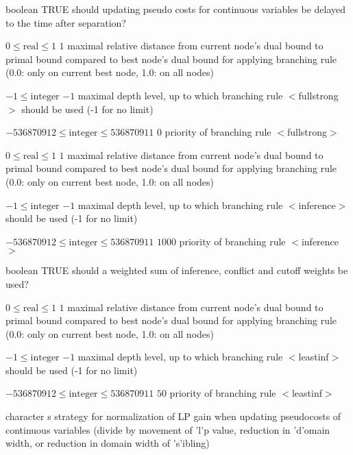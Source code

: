 %
{boolean}%
{TRUE}%
{should updating pseudo costs for continuous variables be delayed to the time after separation?}%
{}

%
{$0\leq\textrm{real}\leq1$}%
{$1$}%
{maximal relative distance from current node's dual bound to primal bound compared to best node's dual bound for applying branching rule (0.0: only on current best node, 1.0: on all nodes)}%
{}

%
{$-1\leq\textrm{integer}$}%
{$-1$}%
{maximal depth level, up to which branching rule $<$fullstrong$>$ should be used (-1 for no limit)}%
{}

%
{$-536870912\leq\textrm{integer}\leq536870911$}%
{$0$}%
{priority of branching rule $<$fullstrong$>$}%
{}

%
{$0\leq\textrm{real}\leq1$}%
{$1$}%
{maximal relative distance from current node's dual bound to primal bound compared to best node's dual bound for applying branching rule (0.0: only on current best node, 1.0: on all nodes)}%
{}

%
{$-1\leq\textrm{integer}$}%
{$-1$}%
{maximal depth level, up to which branching rule $<$inference$>$ should be used (-1 for no limit)}%
{}

%
{$-536870912\leq\textrm{integer}\leq536870911$}%
{$1000$}%
{priority of branching rule $<$inference$>$}%
{}

%
{boolean}%
{TRUE}%
{should a weighted sum of inference, conflict and cutoff weights be used?}%
{}

%
{$0\leq\textrm{real}\leq1$}%
{$1$}%
{maximal relative distance from current node's dual bound to primal bound compared to best node's dual bound for applying branching rule (0.0: only on current best node, 1.0: on all nodes)}%
{}

%
{$-1\leq\textrm{integer}$}%
{$-1$}%
{maximal depth level, up to which branching rule $<$leastinf$>$ should be used (-1 for no limit)}%
{}

%
{$-536870912\leq\textrm{integer}\leq536870911$}%
{$50$}%
{priority of branching rule $<$leastinf$>$}%
{}

%
{character}%
{s}%
{strategy for normalization of LP gain when updating pseudocosts of continuous variables (divide by movement of 'l'p value, reduction in 'd'omain width, or reduction in domain width of 's'ibling)}%
{}


